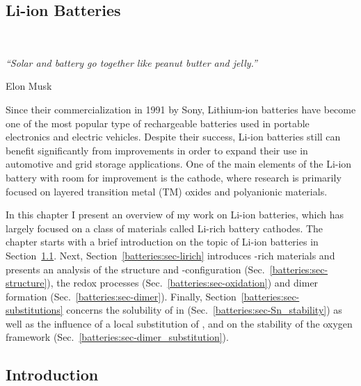 \begin{refsection} 
 
\chapter{Li-ion Batteries}~\label{chapter:batteries} 
 
\setlength{\epigraphwidth}{3in} 
\epigraph{\textit{``Solar and battery go together like peanut butter and 
jelly.” }}{Elon Musk} 
\vspace{3em} 
 
Since their commercialization in 1991 by Sony, Lithium-ion batteries have 
become one of the most popular type of rechargeable batteries used in portable 
electronics and electric vehicles. Despite their success, Li-ion batteries 
still can benefit significantly from improvements in order to expand their use in 
automotive and grid storage applications. One of the main elements of the 
Li-ion battery with room for improvement is the cathode, where research is primarily 
focused on layered transition metal (TM) oxides and polyanionic materials.  
 
In this chapter I present an overview of my work on Li-ion batteries, which 
has largely focused on a class of materials called Li-rich battery cathodes. 
The chapter starts with a brief introduction on the topic of Li-ion 
batteries in Section~\ref{batteries:sec-intro}. Next, 
Section~\ref{batteries:sec-lirich} introduces -rich materials and 
presents an analysis of the structure and -configuration 
(Sec.~\ref{batteries:sec-structure}), the redox processes 
(Sec.~\ref{batteries:sec-oxidation}) and dimer formation 
(Sec.~\ref{batteries:sec-dimer}). Finally, 
Section~\ref{batteries:sec-substitutions} concerns the solubility of  
in  (Sec.~\ref{batteries:sec-Sn_stability}) as well as the 
influence of a local substitution of ,  and  on the 
stability of the oxygen framework 
(Sec.~\ref{batteries:sec-dimer_substitution}). 
 
\clearpage 
 
\section{Introduction} \label{batteries:sec-intro} 
 

\end{refsection}
